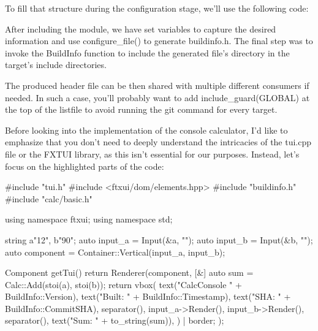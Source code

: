 To fill that structure during the configuration stage, we’ll use the following code:



After including the module, we have set variables to capture the desired information and use configure\_file() to generate buildinfo.h. The final step was to invoke the BuildInfo function to include the generated file’s directory in the target’s include directories.

The produced header file can be then shared with multiple different consumers if needed. In such a case, you’ll probably want to add include\_guard(GLOBAL) at the top of the listfile to avoid running the git command for every target.

Before looking into the implementation of the console calculator, I’d like to emphasize that you don’t need to deeply understand the intricacies of the tui.cpp file or the FXTUI library, as this isn’t essential for our purposes. Instead, let’s focus on the highlighted parts of the code:


\begin{cpp}
#include "tui.h"
#include <ftxui/dom/elements.hpp>
#include "buildinfo.h"
#include "calc/basic.h"

using namespace ftxui;
using namespace std;

string a{"12"}, b{"90"};
auto input_a = Input(&a, "");
auto input_b = Input(&b, "");
auto component = Container::Vertical({input_a, input_b});

Component getTui() {
    return Renderer(component, [&] {
        auto sum = Calc::Add(stoi(a), stoi(b));
        return vbox({
            text("CalcConsole " + BuildInfo::Version),
            text("Built: " + BuildInfo::Timestamp),
            text("SHA: " + BuildInfo::CommitSHA),
            separator(),
            input_a->Render(),
            input_b->Render(),
            separator(),
            text("Sum: " + to_string(sum)),
        }) |
        border;
    });
}
\end{cpp}

